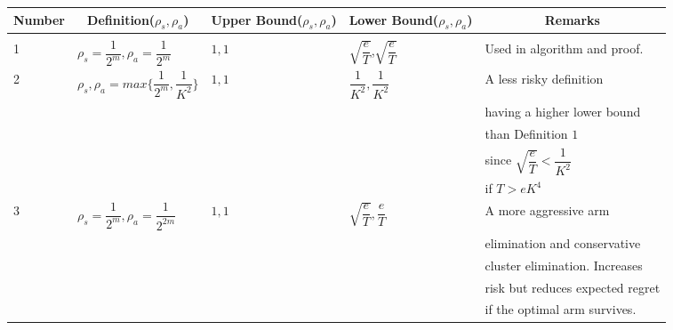 \begin{center}
\begin{tabular}{l|l|l|l|l}
\multicolumn{1}{c}{\bf Number} &\multicolumn{1}{c}{\bf Definition($\rho_{s},\rho_{a}$)}  &\multicolumn{1}{c}{\bf Upper Bound($\rho_{s},\rho_{a}$)} &\multicolumn{1}{c}{\bf Lower Bound($\rho_{s},\rho_{a}$)} &\multicolumn{1}{c}{\bf Remarks} \\
\hline \\
1	&$\rho_{s}=\dfrac{1}{2^{m}},\rho_{a}=\dfrac{1}{2^{m}}$         & $1,1$  &$\sqrt{\dfrac{e}{T}}$,$\sqrt{\dfrac{e}{T}}$ & Used in algorithm and proof. \\ 
2	&$\rho_{s},\rho_{a}=max\bigg\lbrace\dfrac{1}{2^{m}},\dfrac{1}{K^{2}}\bigg\rbrace$         & $1,1$  &$\dfrac{1}{K^{2}},\dfrac{1}{K^{2}}$ & A less risky definition \\
&&&& having a higher lower bound \\
&&&& than Definition $1$ \\
&&&& since $\sqrt{\dfrac{e}{T}}< \dfrac{1}{K^{2}}$ \\
&&&& if $T> eK^{4}$\\ 

3	&$\rho_{s}=\dfrac{1}{2^{m}},\rho_{a}=\dfrac{1}{2^{2m}}$         & $1,1$  &$\sqrt{\dfrac{e}{T}},\dfrac{e}{T}$ & A more aggressive arm \\&&&& elimination and conservative \\&&&&  cluster elimination. Increases \\&&&& risk but reduces expected regret \\&&&&  if the optimal arm survives.\\ 
\end{tabular}
\end{center}

